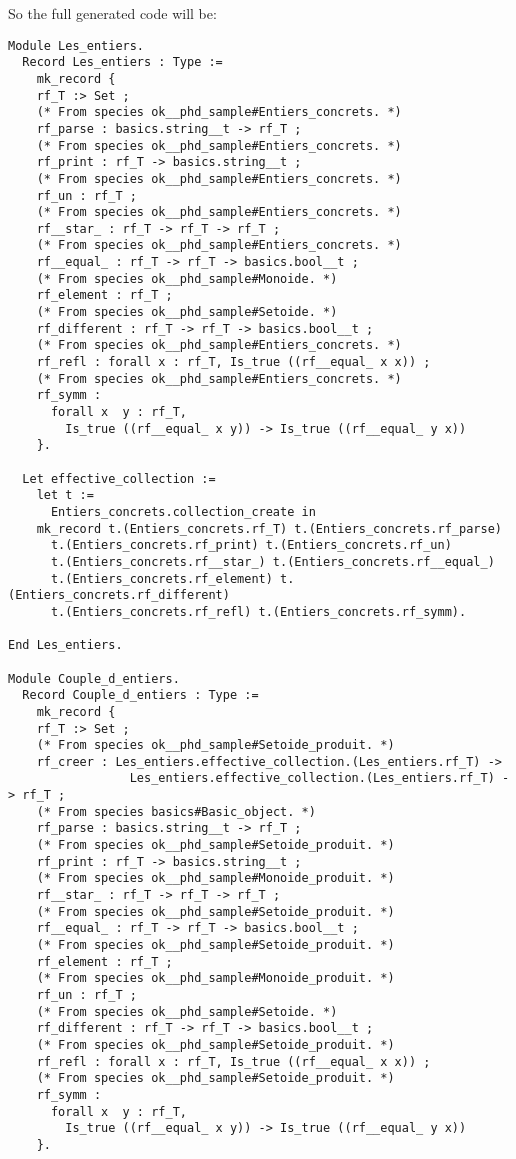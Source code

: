 So the full generated code will be:
{\footnotesize
\begin{lstlisting}[language=MyCoq]
Module Les_entiers.
  Record Les_entiers : Type :=
    mk_record {
    rf_T :> Set ;
    (* From species ok__phd_sample#Entiers_concrets. *)
    rf_parse : basics.string__t -> rf_T ;
    (* From species ok__phd_sample#Entiers_concrets. *)
    rf_print : rf_T -> basics.string__t ;
    (* From species ok__phd_sample#Entiers_concrets. *)
    rf_un : rf_T ;
    (* From species ok__phd_sample#Entiers_concrets. *)
    rf__star_ : rf_T -> rf_T -> rf_T ;
    (* From species ok__phd_sample#Entiers_concrets. *)
    rf__equal_ : rf_T -> rf_T -> basics.bool__t ;
    (* From species ok__phd_sample#Monoide. *)
    rf_element : rf_T ;
    (* From species ok__phd_sample#Setoide. *)
    rf_different : rf_T -> rf_T -> basics.bool__t ;
    (* From species ok__phd_sample#Entiers_concrets. *)
    rf_refl : forall x : rf_T, Is_true ((rf__equal_ x x)) ;
    (* From species ok__phd_sample#Entiers_concrets. *)
    rf_symm :
      forall x  y : rf_T,
        Is_true ((rf__equal_ x y)) -> Is_true ((rf__equal_ y x))
    }.
  
  Let effective_collection :=
    let t :=
      Entiers_concrets.collection_create in 
    mk_record t.(Entiers_concrets.rf_T) t.(Entiers_concrets.rf_parse)
      t.(Entiers_concrets.rf_print) t.(Entiers_concrets.rf_un)
      t.(Entiers_concrets.rf__star_) t.(Entiers_concrets.rf__equal_)
      t.(Entiers_concrets.rf_element) t.(Entiers_concrets.rf_different)
      t.(Entiers_concrets.rf_refl) t.(Entiers_concrets.rf_symm).
    
End Les_entiers.

Module Couple_d_entiers.
  Record Couple_d_entiers : Type :=
    mk_record {
    rf_T :> Set ;
    (* From species ok__phd_sample#Setoide_produit. *)
    rf_creer : Les_entiers.effective_collection.(Les_entiers.rf_T) ->
                 Les_entiers.effective_collection.(Les_entiers.rf_T) -> rf_T ;
    (* From species basics#Basic_object. *)
    rf_parse : basics.string__t -> rf_T ;
    (* From species ok__phd_sample#Setoide_produit. *)
    rf_print : rf_T -> basics.string__t ;
    (* From species ok__phd_sample#Monoide_produit. *)
    rf__star_ : rf_T -> rf_T -> rf_T ;
    (* From species ok__phd_sample#Setoide_produit. *)
    rf__equal_ : rf_T -> rf_T -> basics.bool__t ;
    (* From species ok__phd_sample#Setoide_produit. *)
    rf_element : rf_T ;
    (* From species ok__phd_sample#Monoide_produit. *)
    rf_un : rf_T ;
    (* From species ok__phd_sample#Setoide. *)
    rf_different : rf_T -> rf_T -> basics.bool__t ;
    (* From species ok__phd_sample#Setoide_produit. *)
    rf_refl : forall x : rf_T, Is_true ((rf__equal_ x x)) ;
    (* From species ok__phd_sample#Setoide_produit. *)
    rf_symm :
      forall x  y : rf_T,
        Is_true ((rf__equal_ x y)) -> Is_true ((rf__equal_ y x))
    }.
  

\end{lstlisting}}
